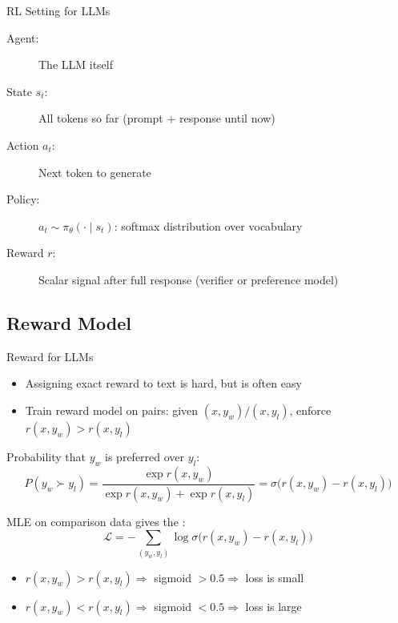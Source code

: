 \begin{frame}{RL Setting for LLMs}
\begin{center}
  \end{center}

  \vspace{0.3em}
  \begin{description}
    \item[Agent:] The LLM itself
    \item[State $s_t$:] All tokens so far (prompt + response until now)
    \item[Action $a_t$:] Next token to generate
    \item[Policy:] $a_t \sim \pi_\theta(\cdot \mid s_t)$: softmax distribution over vocabulary
    \item[Reward $r$:] Scalar signal after full response (verifier or preference model)
  \end{description}
\end{frame}


\subsection{Reward Model}

\begin{frame}{Reward for LLMs}
  \begin{itemize}
    \item Assigning exact reward to text is hard, but  is often easy
    \item Train reward model on pairs: given $(x, y_w)/(x, y_l)$, enforce $r(x, y_w) > r(x, y_l)$
  \end{itemize}

  \begin{tcolorbox}[colback=green!3, colframe=green!40!black, boxrule=0.5pt, arc=2pt, title={\small Bradley-Terry Model}, fonttitle=\bfseries]
    Probability that $y_w$ is preferred over $y_l$:
    \[
      P(y_w \succ y_l) = \frac{\exp r(x, y_w)}{\exp r(x, y_w) + \exp r(x, y_l)} = \sigma\bigl(r(x, y_w) - r(x, y_l)\bigr)
    \]

    \vspace{-0.5em}
    MLE on comparison data gives the :
    \[
      \mathcal{L} = -\sum_{(y_w, y_l)} \log \sigma\bigl(r(x, y_w) - r(x, y_l)\bigr)
    \]
  \end{tcolorbox}

  \vspace{0.2em}
  \begin{itemize}[nosep]
    \item $r(x, y_w) > r(x, y_l) \Rightarrow$ sigmoid $> 0.5 \Rightarrow$ loss is small
    \item $r(x, y_w) < r(x, y_l) \Rightarrow$ sigmoid $< 0.5 \Rightarrow$ loss is large
  \end{itemize}
\end{frame}

